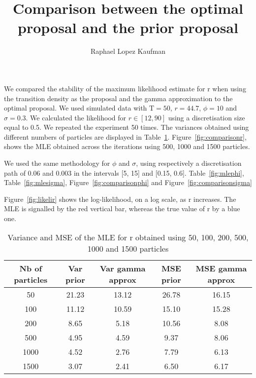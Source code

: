 \documentclass{article}
\title{Comparison between the optimal proposal and the prior proposal}
\author{Raphael Lopez Kaufman}
\date{}
\begin{document}
We compared the stability of the maximum likelihood estimate for r when using the transition density as the proposal and the gamma approximation to the optimal proposal. We used simulated data with $\mathrm{T}=50$, $r=44.7$, $\phi=10$ and $\sigma=0.3$. We calculated the likelihood for $r \in [12, 90]$ using a discretisation size equal to 0.5. We repeated the experiment 50 times. The variances obtained using different numbers of particles are displayed in Table~\ref{table:mle}. Figure~\ref{fig:comparisonr}, shows the MLE obtained across the iterations using 500, 1000 and 1500 particles.

We used the same methodology for $\phi$ and $\sigma$, using respectively a discretisation path of 0.06 and 0.003 in the intervals [5, 15] and [0.15, 0.6]. Table~\ref{fig:mlephi}, Table~\ref{fig:mlesigma}, Figure~\ref{fig:comparisonphi} and Figure~\ref{fig:comparisonsigma}


Figure~\ref{fig:likelir} shows the log-likelihood, on a log scale, as r increases. The MLE is signalled by the red vertical bar, whereas the true value of r by a blue one. 

	\begin{table}[htb]
		\centering
		\vspace{5mm}
		\begin{tabular}{c|c|c|c|c}
			Nb of particles & Var prior &  Var gamma approx & MSE prior & MSE gamma approx \\ \hline
			50 & 21.23 & 13.12 & 26.78 & 16.15\\ \hline
			100 & 11.12 & 10.59 & 15.10 & 15.28\\ \hline
			200 & 8.65 & 5.18 & 10.56 & 8.08\\ \hline
			500 & 4.95 & 4.59 & 9.37 & 8.06\\ \hline
			1000 & 4.52 & 2.76 & 7.79 & 6.13\\ \hline
			1500 & 3.07 & 2.41 & 6.50 & 6.17 \\ \hline
		\end{tabular}
		\caption{Variance and MSE of the MLE for r obtained using 50, 100, 200, 500, 1000 and 1500 particles}
		\label{table:mle}
		\vspace{5mm}
	\end{table}
\end{document}
